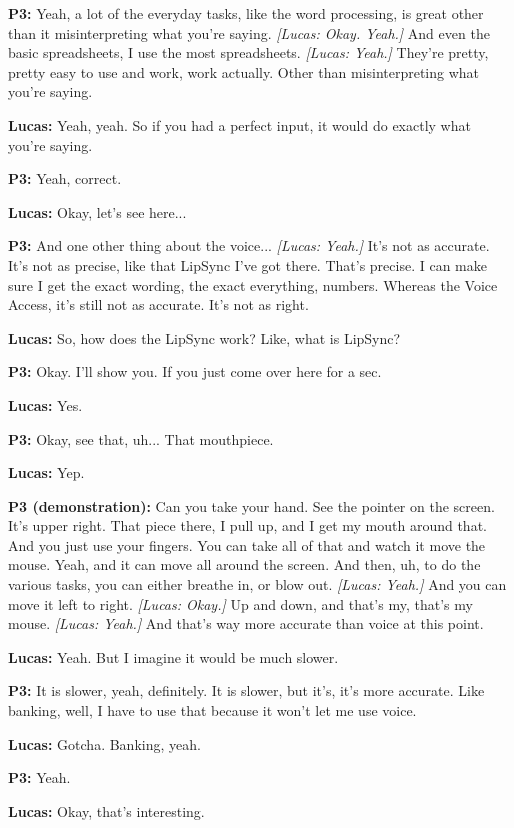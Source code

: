 \textbf{P3:} Yeah, a lot of the everyday tasks, like the word processing, is great other than it misinterpreting what you're saying. \textit{[Lucas: Okay. Yeah.]} And even the basic spreadsheets, I use the most spreadsheets. \textit{[Lucas: Yeah.]} They're pretty, pretty easy to use and work, work actually. Other than misinterpreting what you're saying. 

\textbf{Lucas:} Yeah, yeah. So if you had a perfect input, it would do exactly what you're saying. 

\textbf{P3:} Yeah, correct. 

\textbf{Lucas:} Okay, let's see here... 

\textbf{P3:} And one other thing about the voice... \textit{[Lucas: Yeah.]} It's not as accurate. It's not as precise, like that LipSync I've got there. That's precise. I can make sure I get the exact wording, the exact everything, numbers. Whereas the Voice Access, it's still not as accurate. It's not as right. 

\textbf{Lucas:} So, how does the LipSync work? Like, what is LipSync? 

\textbf{P3:} Okay. I'll show you. If you just come over here for a sec. 

\textbf{Lucas:} Yes. 

\textbf{P3:} Okay, see that, uh... That mouthpiece. 

\textbf{Lucas:} Yep. 

\textbf{P3 (demonstration):} Can you take your hand. See the pointer on the screen. It's upper right. That piece there, I pull up, and I get my mouth around that. And you just use your fingers. You can take all of that and watch it move the mouse. Yeah, and it can move all around the screen. And then, uh, to do the various tasks, you can either breathe in, or blow out. \textit{[Lucas: Yeah.]} And you can move it left to right. \textit{[Lucas: Okay.]} Up and down, and that's my, that's my mouse. \textit{[Lucas: Yeah.]} And that's way more accurate than voice at this point. 

\textbf{Lucas:} Yeah. But I imagine it would be much slower. 

\textbf{P3:} It is slower, yeah, definitely. It is slower, but it's, it's more accurate. Like banking, well, I have to use that because it won't let me use voice. 

\textbf{Lucas:} Gotcha. Banking, yeah. 

\textbf{P3:} Yeah. 

\textbf{Lucas:} Okay, that's interesting. 

